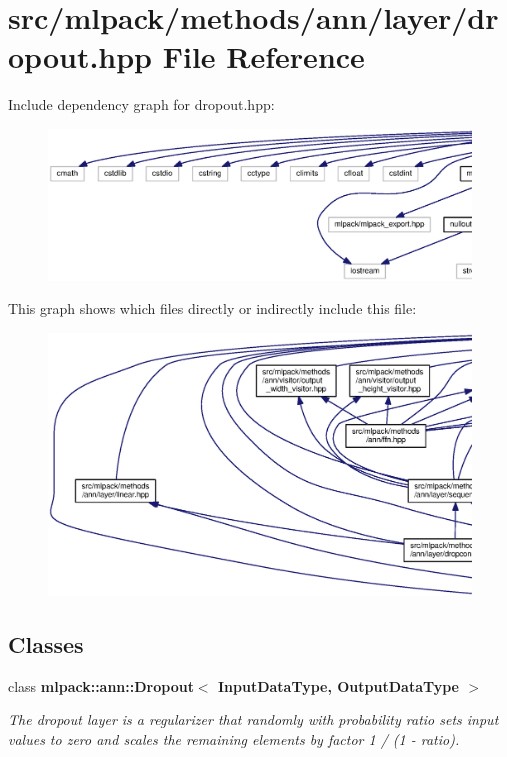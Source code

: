 \section{src/mlpack/methods/ann/layer/dropout.hpp File Reference}
\label{dropout_8hpp}
Include dependency graph for dropout.\+hpp\+:
\nopagebreak
\begin{figure}[H]
\begin{center}
\leavevmode
\includegraphics[width=350pt]{dropout_8hpp__incl}
\end{center}
\end{figure}
This graph shows which files directly or indirectly include this file\+:
\nopagebreak
\begin{figure}[H]
\begin{center}
\leavevmode
\includegraphics[width=350pt]{dropout_8hpp__dep__incl}
\end{center}
\end{figure}
\subsection*{Classes}
\begin{DoxyCompactItemize}
\item 
class {\bf mlpack\+::ann\+::\+Dropout$<$ Input\+Data\+Type, Output\+Data\+Type $>$}
\begin{DoxyCompactList}\small\item\em The dropout layer is a regularizer that randomly with probability ratio sets input values to zero and scales the remaining elements by factor 1 / (1 -\/ ratio). \end{DoxyCompactList}\end{DoxyCompactItemize}
